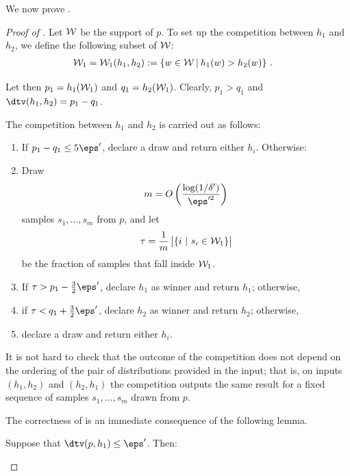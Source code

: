 We now prove .

\begin{proof}[Proof of ]
Let ${\cal W}$ be the support of $p$. To set up the competition between $h_1$ and $h_2$, we define the following subset of ${\cal W}$:
\begin{align}
&{\cal W}_1={\cal W}_1(h_1,h_2) := \left\{w \in \mathcal{W}~\vline~h_1(w) > h_2(w) \right\}\,. \label{eq:W1}
%
%
\end{align}

\noindent Let then $p_1 = h_1({\cal W}_1)$ and $q_1 = h_2({\cal W}_1)$. Clearly, $p_1 > q_1$ and
 $\dtv(h_1, h_2) = p_1-q_1$.

%

The competition between $h_1$ and $h_2$ is carried out as follows:

\begin{enumerate}
\item  If $p_1-q_1\leq 5 \eps'$, declare a draw and return either $h_i$. Otherwise:

\item  Draw 
  \[
  m=O\left(\frac{\log(1/\delta')}{\eps'^2}\right)
  \]
  samples $s_1,\ldots,s_m$ from $p$, and let 
  \[
  \tau = \frac{1}{m}\, \bigl| \{i~|~s_i \in {\cal W}_1 \}\bigr|
  \]
  be the fraction of  samples that fall inside ${\cal W}_1$.


\item  If $\tau > p_1- \frac{3}{2} \eps'$, declare $h_1$ as winner and return $h_1$; otherwise,

\item  if $\tau < q_1+ \frac{3}{2} \eps'$, declare $h_2$ as winner and return $h_2$; otherwise,

\item  declare a draw and return either $h_i$.

\end{enumerate}

It is not hard to check that the outcome of the competition does not depend on the ordering of the pair of distributions provided in the input; that is, on inputs $(h_1,h_2)$ and $(h_2,h_1)$ the competition outputs the same result for a fixed sequence of samples $s_1,\ldots,s_m$ drawn from $p$.

The correctness of  is an immediate consequence of the following lemma.

%

\begin{lemma} \label{lem:kostas3}
Suppose that $\dtv(p,h_1) \leq \eps'$. Then:
\begin{itemize}


\end{itemize}
\end{lemma}
\end{proof}

